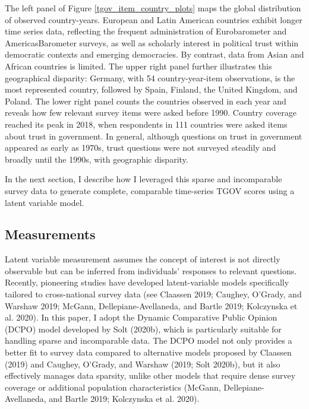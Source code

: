 \documentclass[
  12pt,
]{article}
\begin{document}
The left panel of Figure \nobreakspace{}\ref{tgov_item_country_plots} maps the global distribution of observed country-years.
European and Latin American countries exhibit longer time series data, reflecting the frequent administration of Eurobarometer and AmericasBarometer surveys, as well as scholarly interest in political trust within democratic contexts and emerging democracies.
By contrast, data from Asian and African countries is limited.
The upper right panel further illustrates this geographical disparity: Germany, with 54 country-year-item observations, is the most represented country, followed by Spain, Finland, the United Kingdom, and Poland.
The lower right panel counts the countries observed in each year and reveals how few relevant survey items were asked before 1990.
Country coverage reached its peak in 2018, when respondents in 111 countries were asked items about trust in government.
In general, although questions on trust in government appeared as early as 1970s, trust questions were not surveyed steadily and broadly until the 1990s, with geographic disparity.

In the next section, I describe how I leveraged this sparse and incomparable survey data to generate complete, comparable time-series TGOV scores using a latent variable model.

\subsection{Measurements}\label{measurements}

Latent variable measurement assumes the concept of interest is not directly observable but can be inferred from individuals' responses to relevant questions.
Recently, pioneering studies have developed latent-variable models specifically tailored to cross-national survey data (see Claassen 2019; Caughey, O'Grady, and Warshaw 2019; McGann, Dellepiane-Avellaneda, and Bartle 2019; Kolczynska et al. 2020).
In this paper, I adopt the Dynamic Comparative Public Opinion (DCPO) model developed by Solt (2020b), which is particularly suitable for handling sparse and incomparable data.
The DCPO model not only provides a better fit to survey data compared to alternative models proposed by Claassen (2019) and Caughey, O'Grady, and Warshaw (2019; Solt 2020b), but it also effectively manages data sparsity, unlike other models that require dense survey coverage or additional population characteristics (McGann, Dellepiane-Avellaneda, and Bartle 2019; Kolczynska et al. 2020).
\end{document}
